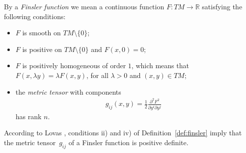 \documentclass[pdftex]{sigma}
\numberwithin{equation}{section}
\begin{document}
\begin{Definition} \label{def:finsler}
By a \emph{Finsler function} we mean a continuous function $F: TM
\to \mathbb{R}$ satisfying the following conditions:
\begin{itemize}\itemsep=0pt
\item[i)] $F$ is smooth on $TM\setminus\{0\}$;
\item[ii)] $F$ is positive on $TM\setminus\{0\}$ and $F(x,0)=0$;
\item[iii)] $F$ is positively homogeneous of order $1$, which
means that $F(x,\lambda y)=\lambda F(x,y)$, for all $\lambda>0$
and $(x,y)\in TM$;
\item[iv)] the \emph{metric tensor} with components
\begin{gather*}
g_{ij}(x,y)=\frac{1}{2}\frac{\partial^2 F^2}{\partial y^i\partial
y^j} %
\end{gather*}
has rank $n$. \end{itemize}
\end{Definition}
According to Lovas \cite{lovas07}, conditions ii) and iv) of
Def\/inition~\ref{def:finsler}  imply that the metric tensor~$g_{ij}$ of
a Finsler function is positive def\/inite.
\end{document}
